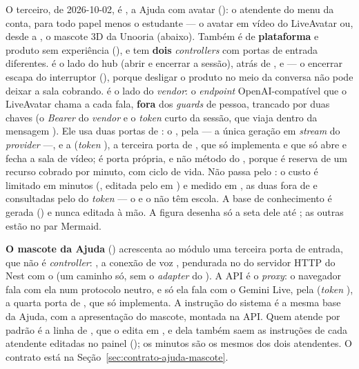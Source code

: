 O terceiro, de 2026-10-02, é , a Ajuda com avatar
(): o atendente do menu da conta, para todo papel menos o
estudante --- o avatar em vídeo do LiveAvatar ou, desde a , o
mascote 3D da Unooria (abaixo). Também é de \textbf{plataforma} e produto sem experiência
(), e tem \textbf{dois} \emph{controllers} com portas de
entrada diferentes.  é o lado do hub (abrir e encerrar
a sessão), atrás de ,  e 
--- o encerrar escapa do interruptor (), porque desligar
o produto no meio da conversa não pode deixar a sala cobrando.
 é o lado do \emph{vendor}: o \emph{endpoint}
OpenAI-compatível que o LiveAvatar chama a cada fala, \textbf{fora} dos
\emph{guards} de pessoa, trancado por duas chaves (o \emph{Bearer} do
\emph{vendor} e o \emph{token} curto da sessão, que viaja dentro da mensagem
). Ele usa duas portas de : o , pela
 --- a única geração em \emph{stream} do \emph{provider}
---, e a  (\emph{token} ), a terceira
porta de , que só  implementa e que só
abre e fecha a sala de vídeo; é porta própria, e não método do ,
porque é reserva de um recurso cobrado por minuto, com ciclo de vida. Não passa
pelo : o custo é limitado em minutos (,
editada pelo  em ) e
medido em , as duas fora de  e consultadas
pelo  do \emph{token} --- o  e o 
não têm escola. A base de conhecimento é gerada
() e nunca editada à mão. A
figura desenha só a seta dele até ; as outras estão no par Mermaid.

\textbf{O mascote da Ajuda} () acrescenta ao módulo uma terceira
porta de entrada, que não é \emph{controller}: ,
a conexão de voz , pendurada no  do
servidor HTTP do Nest com o  (um caminho só, sem o \emph{adapter} do
). A API é o \emph{proxy}: o navegador fala com ela num
protocolo neutro, e só ela fala com o Gemini Live, pela 
(\emph{token} ), a quarta porta de , que só
 implementa. A instrução do sistema é a mesma
base da Ajuda, com a apresentação do mascote, montada na API. Quem atende por
padrão é a linha de , que o  edita em
, e dela também saem as
instruções de cada atendente editadas no painel (); os minutos são os
mesmos dos dois atendentes. O contrato está na
Seção~\ref{sec:contrato-ajuda-mascote}.

